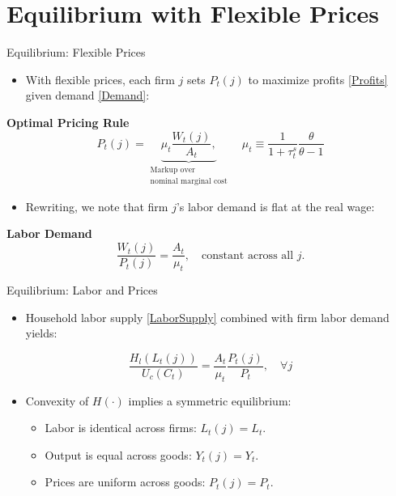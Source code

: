 \documentclass[11pt,aspectratio=169]{beamer}
\begin{document}
\section{Equilibrium with Flexible Prices\label{CH5-Flex}}

\begin{frame}[label=FlexEquilibrium]{Equilibrium: Flexible Prices}
\small

\begin{itemize}
  \item With flexible prices, each firm $j$ sets $P_t(j)$ to maximize profits \eqref{Profits} given demand \eqref{Demand}:
\end{itemize}

\textbf{Optimal Pricing Rule}
\begin{equation*}
P_t(j) = \underbrace{\mu_t \frac{W_t(j)}{A_t},}_{\substack{\text{Markup over} \\ \text{nominal marginal cost}}}
\quad 
\mu_t \equiv \frac{1}{1+\tau_t^s} \frac{\theta}{\theta-1}
\end{equation*}
\begin{itemize}
  \item Rewriting, we note that firm $j$'s labor demand is flat at the real wage:
\end{itemize}
\textbf{Labor Demand}
\begin{equation*}
\frac{W_t(j)}{P_t(j)} = \frac{A_t}{\mu_t}, \quad \text{constant across all } j.
\end{equation*}
\begin{center}
\hyperlink{Appendix D.2}{}
\end{center}
\end{frame}

\begin{frame}[label=LaborEquilibrium]{Equilibrium: Labor and Prices}
\small

\begin{itemize}
  \item Household labor supply \eqref{LaborSupply} combined with firm labor demand yields:
\end{itemize}
\begin{equation*}
\frac{H_l(L_t(j))}{U_c(C_t)} = \frac{A_t}{\mu_t}\frac{P_t(j)}{P_t}, \quad \forall j
\end{equation*}

\begin{itemize}
  \item Convexity of $H(\cdot)$ implies a symmetric equilibrium:
  \begin{itemize}
      \item Labor is identical across firms: $L_t(j) = L_t$.
      \item Output is equal across goods: $Y_t(j) = Y_t$.
      \item Prices are uniform across goods: $P_t(j) = P_t$.
  \end{itemize}
\end{itemize}

\end{frame}
\end{document}
